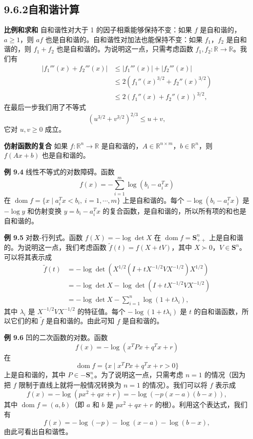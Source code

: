 \documentclass[UTF8,12pt,a4paper,fontset=fandol]{ctexart}
\begin{document}
\subsection*{9.6.2\quad 自和谐计算}

\noindent\textbf{比例和求和}\quad
自和谐性对大于 1 的因子相乘能够保持不变：如果 $f$ 是自和谐的，$a\geq1$，则 $af$ 也是自和谐的。自和谐性对加法也能保持不变：如果 $f_1$，$f_2$ 是自和谐的，则 $f_1+f_2$ 也是自和谐的。为说明这一点，只需考虑函数 $f_1,f_2:\mathbb{R}\to\mathbb{R}$。我们有
\[
\begin{aligned}
|f_1'''(x)+f_2'''(x)|
&\leq |f_1'''(x)|+|f_2'''(x)|\\
&\leq 2(f_1''(x)^{3/2}+f_2''(x)^{3/2})\\
&\leq 2(f_1''(x)+f_2''(x))^{3/2},
\end{aligned}
\]
在最后一步我们用了不等式
\[
(u^{3/2}+v^{3/2})^{2/3}\leq u+v,
\]
它对 $u,v\geq0$ 成立。

\noindent\textbf{仿射函数的复合}\quad
如果 $f:\mathbb{R}^n\to\mathbb{R}$ 是自和谐的，$A\in\mathbb{R}^{n\times m}$，$b\in\mathbb{R}^n$，则 $f(Ax+b)$ 也是自和谐的。

\noindent\textbf{例 9.4}\quad
线性不等式的对数障碍。函数
\[
f(x)=-\sum_{i=1}^m\log(b_i-a_i^Tx)
\]
在 $\operatorname{dom} f=\{x\mid a_i^Tx<b_i,\ i=1,\cdots,m\}$ 上是自和谐的。每个 $-\log(b_i-a_i^Tx)$ 是 $-\log y$ 和仿射变换 $y=b_i-a_i^Tx$ 的复合函数，是自和谐的，所以所有项的和也是自和谐的。

\noindent\textbf{例 9.5}\quad
对数-行列式。函数 $f(X)=-\log\det X$ 在 $\operatorname{dom} f=\mathbf{S}_{++}^n$ 上是自和谐的。为说明这一点，我们考虑函数 $\tilde{f}(t)=f(X+tV)$，其中 $X\succ0$，$V\in\mathbf{S}^n$。可以将其表示成
\[
\begin{aligned}
\tilde{f}(t)
&=-\log\det\left(X^{1/2}(I+tX^{-1/2}VX^{-1/2})X^{1/2}\right)\\
&=-\log\det X-\log\det(I+tX^{-1/2}VX^{-1/2})\\
&=-\log\det X-\sum_{i=1}^n\log(1+t\lambda_i),
\end{aligned}
\]
其中 $\lambda_i$ 是 $X^{-1/2}VX^{-1/2}$ 的特征值。每个 $-\log(1+t\lambda_i)$ 是 $t$ 的自和谐函数，所以它们的和 $\tilde{f}$ 是自和谐的。由此可知 $f$ 是自和谐的。

\noindent\textbf{例 9.6}\quad
凹的二次函数的对数。函数
\[
f(x)=-\log(x^TPx+q^Tx+r)
\]
在
\[
\operatorname{dom} f=\{x\mid x^TPx+q^Tx+r>0\}
\]
上是自和谐的，其中 $P\in-\mathbf{S}_+^n$。为了说明这一点，只需考虑 $n=1$ 的情况（因为把 $f$ 限制于直线上就将一般情况转换为 $n=1$ 的情况）。我们可以将 $f$ 表示成
\[
f(x)=-\log(px^2+qx+r)=-\log(-p(x-a)(b-x)),
\]
其中 $\operatorname{dom} f=(a,b)$（即 $a$ 和 $b$ 是 $px^2+qx+r$ 的根）。利用这个表达式，我们有
\[
f(x)=-\log(-p)-\log(x-a)-\log(b-x),
\]
由此可看出自和谐性。
\end{document}
